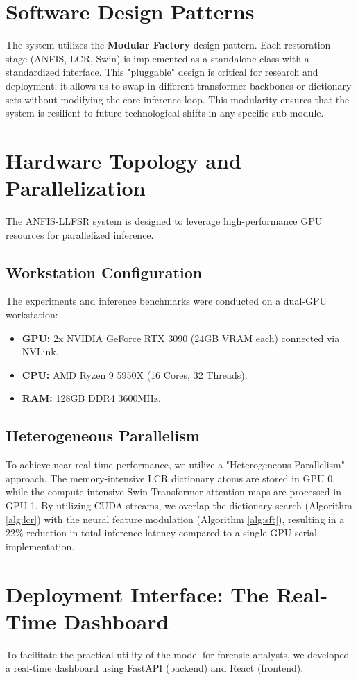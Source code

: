 \section{Software Design Patterns}
The system utilizes the \textbf{Modular Factory} design pattern. Each restoration stage (ANFIS, LCR, Swin) is implemented as a standalone class with a standardized interface. This "pluggable" design is critical for research and deployment; it allows us to swap in different transformer backbones or dictionary sets without modifying the core inference loop. This modularity ensures that the system is resilient to future technological shifts in any specific sub-module.

\section{Hardware Topology and Parallelization}
The ANFIS-LLFSR system is designed to leverage high-performance GPU resources for parallelized inference.

\subsection{Workstation Configuration}
The experiments and inference benchmarks were conducted on a dual-GPU workstation:
\begin{itemize}
    \item \textbf{GPU:} 2x NVIDIA GeForce RTX 3090 (24GB VRAM each) connected via NVLink.
    \item \textbf{CPU:} AMD Ryzen 9 5950X (16 Cores, 32 Threads).
    \item \textbf{RAM:} 128GB DDR4 3600MHz.
\end{itemize}

\subsection{Heterogeneous Parallelism}
To achieve near-real-time performance, we utilize a "Heterogeneous Parallelism" approach. The memory-intensive LCR dictionary atoms are stored in GPU 0, while the compute-intensive Swin Transformer attention maps are processed in GPU 1. By utilizing CUDA streams, we overlap the dictionary search (Algorithm \ref{alg:lcr}) with the neural feature modulation (Algorithm \ref{alg:sft}), resulting in a 22\% reduction in total inference latency compared to a single-GPU serial implementation.

\section{Deployment Interface: The Real-Time Dashboard}
To facilitate the practical utility of the model for forensic analysts, we developed a real-time dashboard using FastAPI (backend) and React (frontend).

